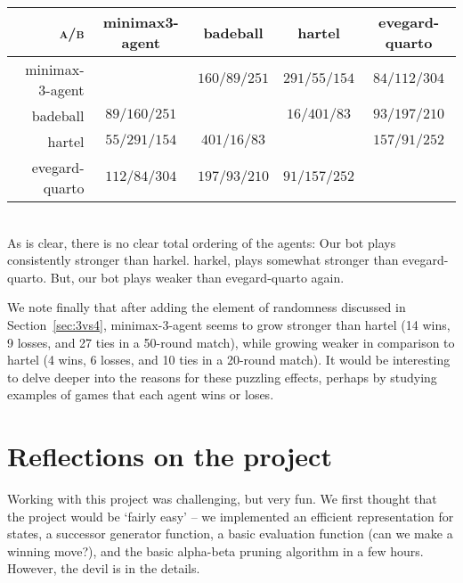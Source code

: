 \documentclass[a4paper,9pt]{article}
\begin{document}
{ 
\begin{tabular}{r|c|c|c|c}
  \textsc{a/b} & \textsf{minimax3-agent} & 
                 \textsf{badeball} & \textsf{hartel} 
               & \textsf{evegard-quarto} \\
  \hline
  \textsf{minimax-3-agent}  &  & $160/89/251$ & $291/55/154$ & $84/112/304$ \\
  \hline
  \textsf{badeball}  & $89/160/251$ & & $16/401/83$ & $93/197/210$ \\
  \hline
  \textsf{hartel}  & $55/291/154$ & $401/16/83$ & & $157/91/252$ \\
  \hline
  \textsf{evegard-quarto}  & $112/84/304$ & $197/93/210$ & $91/157/252$ & \\
\end{tabular}
}
\\


As is clear, there is no clear total ordering of the agents: Our bot plays
consistently stronger than \textsf{harkel}. \textsf{harkel}, plays somewhat
stronger than \textsf{evegard-quarto}. But, our bot plays weaker than
\textsf{evegard-quarto} again.  

We note finally that after adding the element of randomness discussed in
Section~\ref{sec:3vs4}, \textsf{minimax-3-agent} seems to grow stronger than
\textsf{hartel} (14 wins, 9 losses, and 27 ties in a 50-round match), while
growing weaker in comparison to \textsf{hartel} (4 wins, 6 losses, and 10 ties
in a 20-round match). It would be interesting to delve deeper into the reasons
for these puzzling effects, perhaps by studying examples of games that each
agent wins or loses.

\section{Reflections on the project}
Working with this project was challenging, but very fun.  We first
thought that the project would be `fairly easy' -- we implemented
an efficient representation for states, a successor generator function, a basic
evaluation function (can we make a winning move?), and the basic alpha-beta
pruning algorithm in a few hours. However, the devil is in the details.
\end{document}
